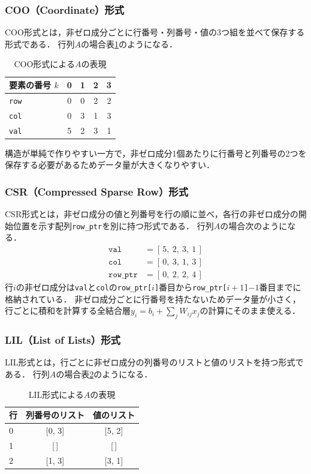 \documentclass[a4paper,11pt,uplatex,dvipdfmx]{jsarticle}
\begin{document}
\subsubsection{COO（Coordinate）形式}
COO形式とは，非ゼロ成分ごとに行番号・列番号・値の3つ組を並べて保存する形式である．
行列$A$の場合表\ref{tab:coo}のようになる．

\begin{table}[H]
  \centering
  \caption{COO形式による$A$の表現}
  \label{tab:coo}
  \begin{tabular}{lcccc}
    \toprule
    要素の番号 $k$ & 0 & 1 & 2 & 3 \\
    \midrule
    \texttt{row} & 0 & 0 & 2 & 2 \\
    \texttt{col} & 0 & 3 & 1 & 3 \\
    \texttt{val} & 5 & 2 & 3 & 1 \\
    \bottomrule
  \end{tabular}
\end{table}

構造が単純で作りやすい一方で，非ゼロ成分1個あたりに行番号と列番号の2つを保存する必要があるためデータ量が大きくなりやすい．

\subsubsection{CSR（Compressed Sparse Row）形式}
CSR形式とは，非ゼロ成分の値と列番号を行の順に並べ，各行の非ゼロ成分の開始位置を示す配列\texttt{row\_ptr}を別に持つ形式である．
行列$A$の場合次のようになる．
\begin{align*}
  \texttt{val}     &= [\,5,\ 2,\ 3,\ 1\,] \\
  \texttt{col}     &= [\,0,\ 3,\ 1,\ 3\,] \\
  \texttt{row\_ptr} &= [\,0,\ 2,\ 2,\ 4\,]
\end{align*}
行$i$の非ゼロ成分は\texttt{val}と\texttt{col}の\texttt{row\_ptr[$i$]}番目から\texttt{row\_ptr[$i+1$]}$-1$番目までに格納されている．
非ゼロ成分ごとに行番号を持たないためデータ量が小さく，行ごとに積和を計算する全結合層$y_i = b_i + \sum_j W_{ij} x_j$の計算にそのまま使える．

\subsubsection{LIL（List of Lists）形式}
LIL形式とは，行ごとに非ゼロ成分の列番号のリストと値のリストを持つ形式である\cite{SciPy}．
行列$A$の場合表\ref{tab:lil}のようになる．

\begin{table}[H]
  \centering
  \caption{LIL形式による$A$の表現}
  \label{tab:lil}
  \begin{tabular}{lcc}
    \toprule
    行 & 列番号のリスト & 値のリスト \\
    \midrule
    0 & [0, 3] & [5, 2] \\
    1 & [\,]   & [\,]   \\
    2 & [1, 3] & [3, 1] \\
    \bottomrule
  \end{tabular}
\end{table}
\end{document}
